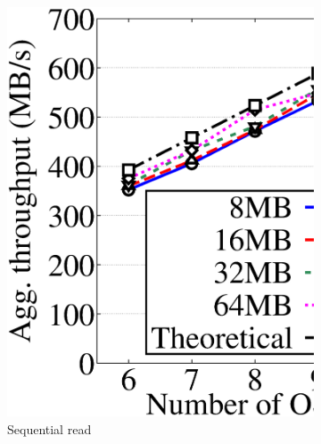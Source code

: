 \begin{figure}[!t]
\begin{subfigure}{0.4\linewidth}
     \includegraphics[width=\linewidth]{charts/transfer/eps/down/rdp_6}
     \caption{Sequential read}
     \label{fig:rdp_read}
 \end{subfigure}
 \hspace{0.005\linewidth}
 \begin{subfigure}{0.4\linewidth}

\end{subfigure}
\end{figure}
